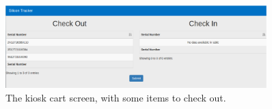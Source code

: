 \documentclass[10pt, onecolumn, twoside, peerreview]{IEEEtran}
\begin{document}
\begin{figure}[!ht]
    \centering
    \captionsetup{justification=centering}
    \includegraphics[width=0.9\textwidth]{img-1.eps}
    \caption{The kiosk cart screen, with some items to check out.}
\end{figure}


\ifCLASSOPTIONcaptionsoff
  \newpage
\fi

\end{document}
